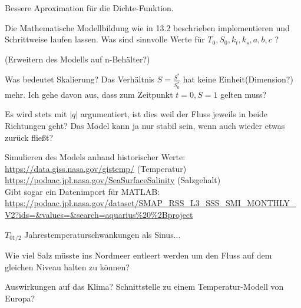 \documentclass[11pt,a4paper]{article}
\begin{document}
	Bessere Aproximation für die Dichte-Funktion.
	
	Die Mathematische Modellbildung wie in 13.2 beschrieben implementieren und Schrittweise laufen lassen. Was sind sinnvolle Werte für \( T_0, S_0, k_t, k_s,  a, b, c\) ?

	(Erweitern des Modells auf n-Behälter?)

	Was bedeutet Skalierung?	 Das Verhältnis \( S = \frac{S^*}{S^*_0} \) hat keine Einheit(Dimension?) mehr. Ich gehe davon aus, dass zum Zeitpunkt \( t=0, S=1 \) gelten muss?
	
	Es wird stets mit \( |q| \) argumentiert, ist dies weil der Fluss jeweils in beide Richtungen geht? Das Model kann ja nur stabil sein, wenn auch wieder etwas zurück fließt?
	
	Simulieren des Models anhand historischer Werte: \\
	\url{https://data.giss.nasa.gov/gistemp/} (Temperatur) \\
	\url{https://podaac.jpl.nasa.gov/SeaSurfaceSalinity} (Salzgehalt) \\
	Gibt sogar ein Datenimport für MATLAB: \url{https://podaac.jpl.nasa.gov/dataset/SMAP_RSS_L3_SSS_SMI_MONTHLY_V2?ids=&values=&search=aquarius%20%2Bproject}
	
	\( T_{0 1/2} \) Jahrestemperaturschwankungen als Sinus...
	
	Wie viel Salz müsste ins Nordmeer entleert werden um den Fluss auf dem gleichen Niveau halten zu können?
	
	Auswirkungen auf das Klima? Schnittstelle zu einem Temperatur-Modell von Europa?
	
\end{document}
